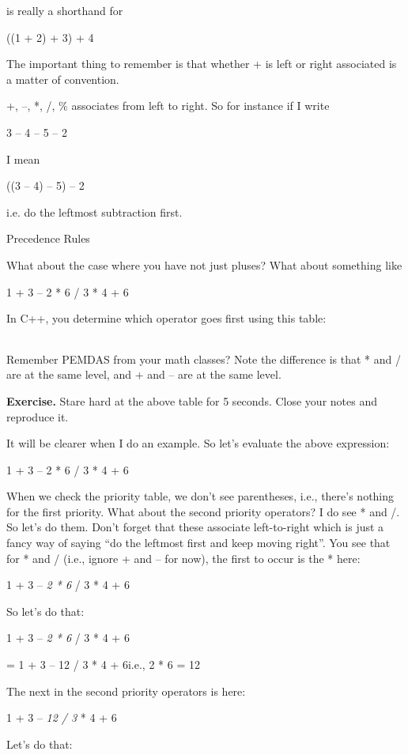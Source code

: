 \documentclass[
]{article}
\begin{document}
is really a shorthand for

((1 + 2) + 3) + 4

The important thing to remember is that whether + is left or right
associated is a matter of convention.

+, --, *, /, \% associates from left to right. So for instance if I
write

3 -- 4 -- 5 -- 2

I mean

((3 -- 4) -- 5) -- 2

i.e. do the leftmost subtraction first.

Precedence Rules

What about the case where you have not just pluses? What about something
like

1 + 3 -- 2 * 6 / 3 * 4 + 6

In C++, you determine which operator goes first using this table:

\begin{longtable}[]{@{}@{}}
\toprule
\endhead
\bottomrule
\end{longtable}

Remember PEMDAS from your math classes? Note the difference is that *
and / are at the same level, and + and -- are at the same level.

\textbf{Exercise.} Stare hard at the above table for 5 seconds. Close
your notes and reproduce it.

It will be clearer when I do an example. So let's evaluate the above
expression:

1 + 3 -- 2 * 6 / 3 * 4 + 6

When we check the priority table, we don't see parentheses, i.e.,
there's nothing for the first priority. What about the second priority
operators? I do see * and /. So let's do them. Don't forget that these
associate left-to-right which is just a fancy way of saying ``do the
leftmost first and keep moving right''. You see that for * and / (i.e.,
ignore + and -- for now), the first to occur is the * here:

1 + 3 -- \emph{2 * 6} / 3 * 4 + 6

So let's do that:

1 + 3 -- \emph{2 * 6} / 3 * 4 + 6

= 1 + 3 -- 12 / 3 * 4 + 6i.e., 2 * 6 = 12

The next in the second priority operators is here:

1 + 3 -- \emph{12 / 3} * 4 + 6

Let's do that:
\end{document}
